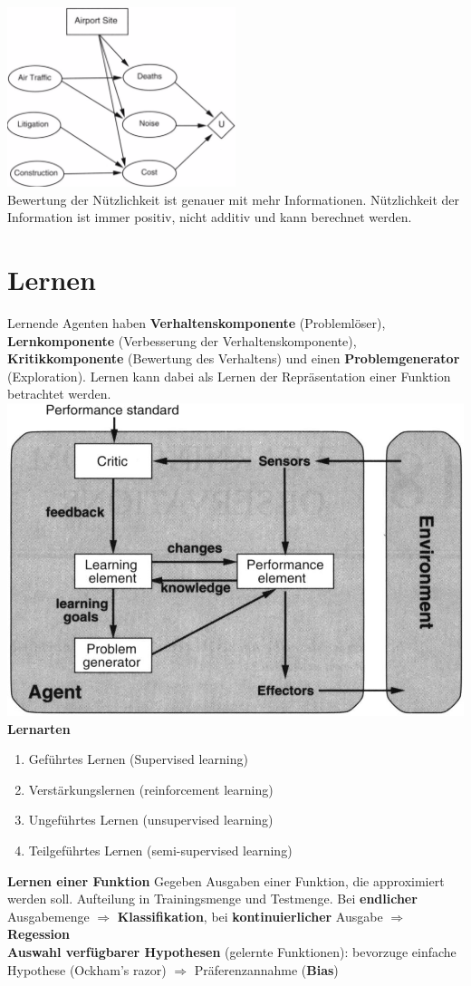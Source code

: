 \documentclass[12pt]{article}
\begin{document}
	\includegraphics[width=0.5\textwidth]{figures/entscheidungsnetz.png}\\
	Bewertung der Nützlichkeit ist genauer mit mehr Informationen. Nützlichkeit der Information ist immer positiv, nicht additiv und kann berechnet werden.
	
	\section{Lernen}
	Lernende Agenten haben \textbf{Verhaltenskomponente} (Problemlöser), \textbf{Lernkomponente} (Verbesserung der Verhaltenskomponente), \textbf{Kritikkomponente} (Bewertung des Verhaltens) und einen \textbf{Problemgenerator} (Exploration). Lernen kann dabei als Lernen der Repräsentation einer Funktion betrachtet werden.\\
	\includegraphics[width=\linewidth]{figures/lernender-agent.JPG}\\
	\textbf{Lernarten}
	\begin{enumerate}
		\item Geführtes Lernen (Supervised learning)
		\item Verstärkungslernen (reinforcement learning)
		\item Ungeführtes Lernen (unsupervised learning)
		\item Teilgeführtes Lernen (semi-supervised learning)
	\end{enumerate}
	\textbf{Lernen einer Funktion} Gegeben Ausgaben einer Funktion, die approximiert werden soll. Aufteilung in Trainingsmenge und Testmenge. Bei \textbf{endlicher} Ausgabemenge $\Rightarrow$ \textbf{Klassifikation}, bei \textbf{kontinuierlicher} Ausgabe $\Rightarrow$ \textbf{Regession}\\
	\textbf{Auswahl verfügbarer Hypothesen} (gelernte Funktionen): bevorzuge einfache Hypothese (Ockham's razor) $\Rightarrow$ Präferenzannahme (\textbf{Bias})
	
\end{document}
